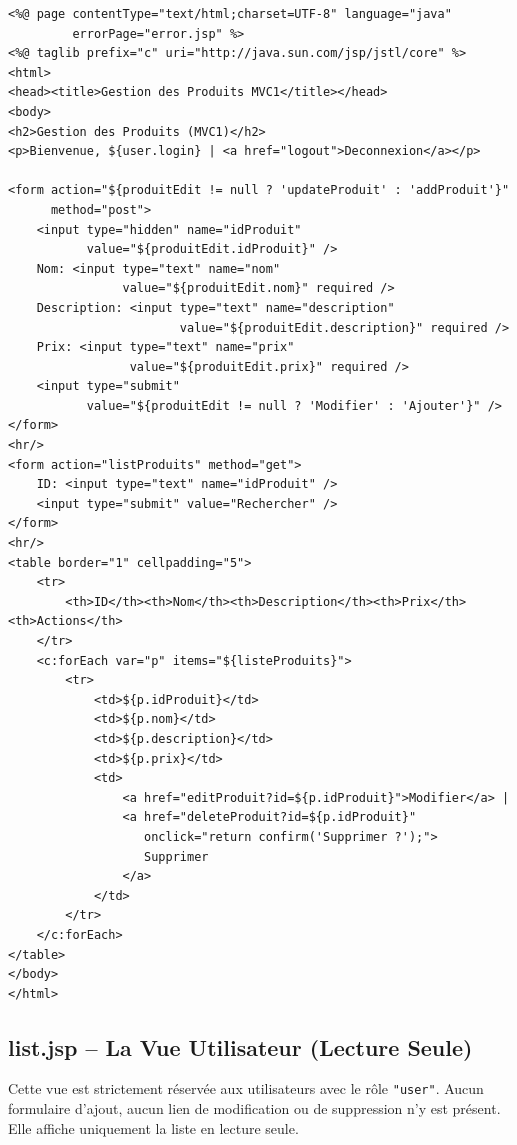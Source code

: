 \documentclass[12pt, a4paper]{article}
\begin{document}
\begin{lstlisting}[style=jspstyle, caption=webapp/index.jsp]
<%@ page contentType="text/html;charset=UTF-8" language="java"
         errorPage="error.jsp" %>
<%@ taglib prefix="c" uri="http://java.sun.com/jsp/jstl/core" %>
<html>
<head><title>Gestion des Produits MVC1</title></head>
<body>
<h2>Gestion des Produits (MVC1)</h2>
<p>Bienvenue, ${user.login} | <a href="logout">Deconnexion</a></p>

<form action="${produitEdit != null ? 'updateProduit' : 'addProduit'}"
      method="post">
    <input type="hidden" name="idProduit"
           value="${produitEdit.idProduit}" />
    Nom: <input type="text" name="nom"
                value="${produitEdit.nom}" required />
    Description: <input type="text" name="description"
                        value="${produitEdit.description}" required />
    Prix: <input type="text" name="prix"
                 value="${produitEdit.prix}" required />
    <input type="submit"
           value="${produitEdit != null ? 'Modifier' : 'Ajouter'}" />
</form>
<hr/>
<form action="listProduits" method="get">
    ID: <input type="text" name="idProduit" />
    <input type="submit" value="Rechercher" />
</form>
<hr/>
<table border="1" cellpadding="5">
    <tr>
        <th>ID</th><th>Nom</th><th>Description</th><th>Prix</th><th>Actions</th>
    </tr>
    <c:forEach var="p" items="${listeProduits}">
        <tr>
            <td>${p.idProduit}</td>
            <td>${p.nom}</td>
            <td>${p.description}</td>
            <td>${p.prix}</td>
            <td>
                <a href="editProduit?id=${p.idProduit}">Modifier</a> |
                <a href="deleteProduit?id=${p.idProduit}"
                   onclick="return confirm('Supprimer ?');">
                   Supprimer
                </a>
            </td>
        </tr>
    </c:forEach>
</table>
</body>
</html>
\end{lstlisting}

\subsection{list.jsp -- La Vue Utilisateur (Lecture Seule)}

Cette vue est strictement réservée aux utilisateurs avec le rôle \texttt{"user"}. Aucun formulaire d'ajout, aucun lien de modification ou de suppression n'y est présent. Elle affiche uniquement la liste en lecture seule.
\end{document}
